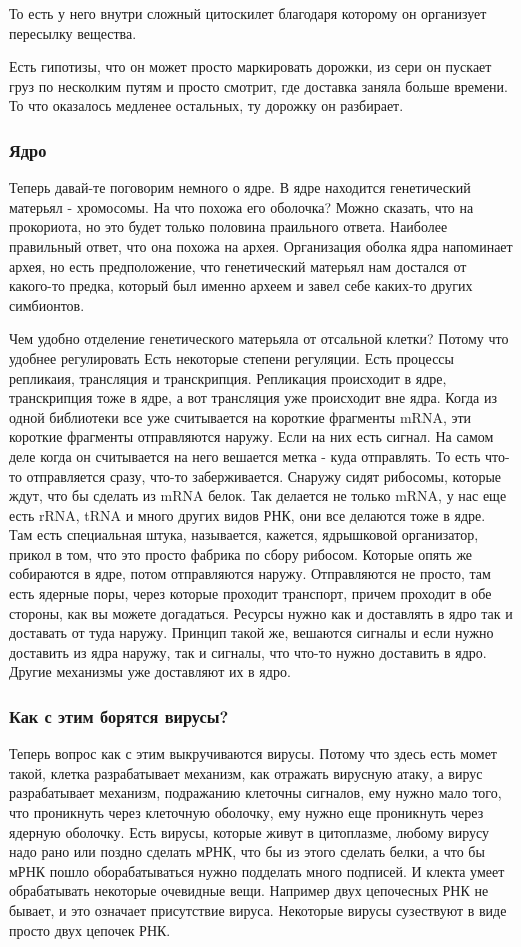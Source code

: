 То есть у него внутри сложный цитоскилет благодаря которому 
он организует пересылку вещества. 

Есть гипотизы, что он может просто маркировать дорожки, из 
сери он пускает груз по несколким путям и просто смотрит, 
где доставка заняла больше времени. То что оказалось медленее остальных, 
ту дорожку он разбирает. 

\subsubsection{Ядро}
Теперь давай-те поговорим немного о ядре. В ядре находится 
генетический матерьял - хромосомы. На что 
похожа его оболочка? Можно сказать, что 
на прокориота, но это будет только 
половина праильного ответа. Наиболее правильный ответ, 
что она похожа на архея. Организация оболка ядра напоминает 
архея, но есть предположение, 
что генетический матерьял нам достался от какого-то предка, 
который был именно археем и завел себе каких-то других симбионтов. 

Чем удобно отделение генетического матерьяла от отсальной клетки? 
Потому что удобнее регулировать Есть некоторые степени регуляции. 
Есть процессы репликаия, трансляция и транскрипция. Репликация происходит в ядре, 
транскрипция тоже в ядре, а вот трансляция уже происходит вне ядра. Когда 
из одной библиотеки все уже считывается на короткие фрагменты mRNA, эти 
короткие фрагменты отправляются наружу. Если на них есть сигнал. На самом 
деле когда он считывается на него вешается метка - куда отправлять. То есть 
что-то отправляется сразу, что-то заберживается. Снаружу сидят рибосомы, 
которые ждут, что бы сделать из 
mRNA белок. Так делается не только mRNA, у нас еще есть rRNA, tRNA и 
много других видов РНК, они все делаются тоже в ядре. Там есть 
специальная штука, называется, кажется, ядрышковой организатор, 
прикол в том, что это просто фабрика по сбору рибосом. Которые 
опять же собираются в ядре, потом отправляются наружу. Отправляются 
не просто, там есть ядерные поры, через которые проходит транспорт, 
причем проходит в обе стороны, как вы можете догадаться. Ресурсы нужно как и доставлять 
в ядро так и доставать от туда наружу. Принцип такой же, вешаются 
сигналы и если нужно доставить из ядра наружу, так и 
сигналы, что что-то нужно доставить в ядро. Другие механизмы уже доставляют их в ядро. 

\subsubsection{Как с этим борятся вирусы?}
Теперь вопрос как с этим выкручиваются вирусы. Потому что здесь 
есть момет такой, клетка разрабатывает механизм, как
отражать вирусную атаку, а вирус разрабатывает 
механизм, подражанию клеточны сигналов, ему нужно 
мало того, что проникнуть через клеточную оболочку, ему нужно 
еще проникнуть через ядерную оболочку. Есть вирусы, которые
живут в цитоплазме, любому вирусу надо рано или 
поздно сделать мРНК, что бы из этого 
сделать белки, а что бы мРНК пошло оборабатываться нужно подделать 
много подписей. И клекта умеет обрабатывать некоторые очевидные вещи. 
Например двух цепочесных РНК не бывает, и это означает присутствие 
вируса. Некоторые вирусы сузествуют в виде просто двух цепочек РНК. 

